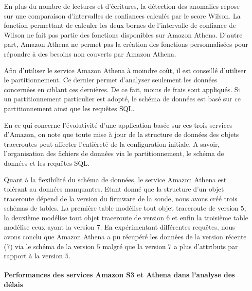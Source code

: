 En plus du nombre de lectures et d'écritures, la détection des anomalies repose sur une comparaison d'intervalles de confiances calculés par le score  Wilson. La fonction permettant de calculer les deux bornes de l'intervalle de confiance de Wilson ne fait pas partie des fonctions disponibles sur Amazon Athena. D'autre part, Amazon Athena ne permet pas la création des fonctions personnalisées pour répondre à des besoins non couverts par Amazon Athena.



Afin d'utiliser le service Amazon Athena à moindre coût, il est conseillé d'utiliser le partitionnement. Ce dernier permet d'analyser seulement les données concernées en ciblant ces dernières. De ce fait, moins de frais sont appliqués. Si un partitionnement particulier est adopté, le schéma de données est basé sur ce partitionnement ainsi que les requêtes SQL.

En ce qui concerne l'évolutivité d'une application basée sur ces trois services d'Amazon, on note que toute mise à jour de la structure de données des objets traceroutes peut affecter l'entièreté de la configuration initiale. A savoir, l'organisation des fichiers de données via le partitionnement, le schéma de données et les requêtes SQL.

 Quant à la flexibilité du schéma de données, le service  Amazon Athena est tolérant au données manquantes. Etant donné que la structure d'un objet traceroute dépend de la version du firmware de la sonde, nous avons créé trois schémas de tables. La première table  modélise tout objet traceroute de  version $5$, la deuxième modélise tout objet traceroute de version $6$ et enfin la troisième table modélise ceux ayant la version $7$. En expérimentant différentes requêtes, nous avons conclu  que Amazon Athena a pu récupéré les données de la version récente ($7$) via le schéma de la version $5$ malgré que la version $7$ a plus d'attributs par rapport à la version $5$.
 
 
 




\paragraph{Performances des services Amazon S3 et Athena dans l'analyse des délais }~


